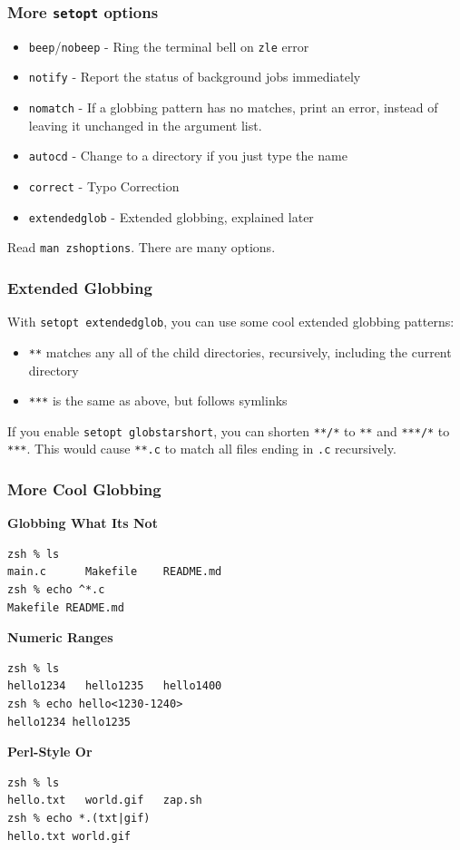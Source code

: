 \documentclass{beamer}
\begin{document}
\begin{frame}
    \frametitle{More \texttt{setopt} options}
    \begin{itemize}
        \item \texttt{beep}/\texttt{nobeep} - Ring the terminal bell on \texttt{zle} error
        \item \texttt{notify} - Report the status of background jobs
            immediately
        \item \texttt{nomatch} - If a globbing pattern has no matches, print an
            error, instead of leaving it unchanged in the argument list.
        \item \texttt{autocd} - Change to a directory if you just type the name
        \item \texttt{correct} - Typo Correction
        \item \texttt{extendedglob} - Extended globbing, explained later
    \end{itemize}

    Read \texttt{man zshoptions}. There are many options.

\end{frame}

\begin{frame}
    \frametitle{Extended Globbing}
    With \texttt{setopt extendedglob}, you can use some cool extended globbing
    patterns:
    \begin{itemize}
        \item \texttt{**} matches any all of the child directories,
            recursively, including the current directory
        \item \texttt{***} is the same as above, but follows symlinks
    \end{itemize}

    If you enable \texttt{setopt globstarshort}, you can shorten \texttt{**/*}
    to \texttt{**} and \texttt{***/*} to \texttt{***}. This would cause
    \texttt{**.c} to match all files ending in \texttt{.c} recursively.
\end{frame}

\begin{frame}[fragile]
    \frametitle{More Cool Globbing}
    \textbf{Globbing What Its Not}
    \begin{verbatim}
zsh % ls
main.c      Makefile    README.md
zsh % echo ^*.c
Makefile README.md\end{verbatim}
    \pause

    \vfill
    \textbf{Numeric Ranges}
    \begin{verbatim}
zsh % ls
hello1234   hello1235   hello1400
zsh % echo hello<1230-1240>
hello1234 hello1235\end{verbatim}
    \pause

    \vfill
    \textbf{Perl-Style Or}
    \begin{verbatim}
zsh % ls
hello.txt   world.gif   zap.sh
zsh % echo *.(txt|gif)
hello.txt world.gif\end{verbatim}
\end{frame}
\end{document}
